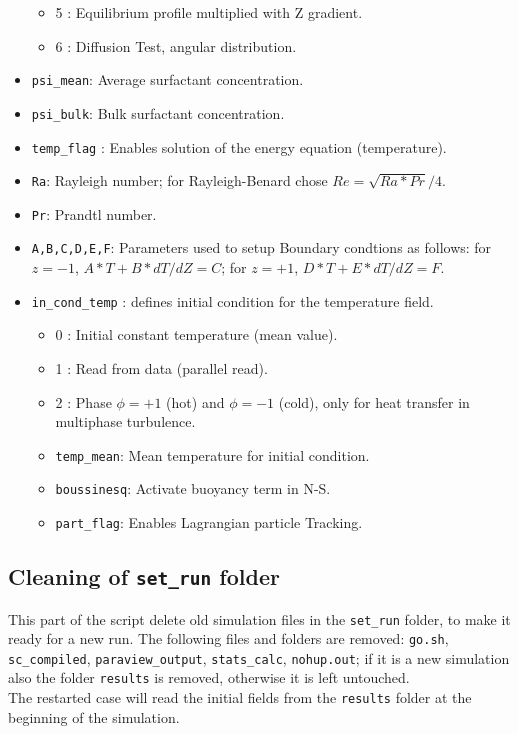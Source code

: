 \begin{itemize}
\begin{itemize}[label={$\circ$}]
\item 5 : Equilibrium profile multiplied with Z gradient.
\item 6 : Diffusion Test, angular distribution.
\end{itemize}
\item \texttt{psi\_mean}: Average surfactant concentration.
\item \texttt{psi\_bulk}: Bulk surfactant concentration.
\item \texttt{temp\_flag} : Enables solution of the energy equation (temperature).
\item \texttt{Ra}: Rayleigh number; for Rayleigh-Benard chose $Re=\sqrt{Ra*Pr}/4$.
\item \texttt{Pr}: Prandtl number.
\item \texttt{A,B,C,D,E,F}: Parameters used to setup Boundary condtions as follows: for $z=-1$, $A*T + B*dT/dZ=C$; for $z=+1$, $D*T + E*dT/dZ=F$. 
\item \texttt{in\_cond\_temp} : defines initial condition for the temperature field.
\begin{itemize}[label={$\circ$}]
\item 0 : Initial constant temperature (mean value).
\item 1 : Read from data (parallel read).
\item 2 : Phase $\phi=+1$ (hot) and $\phi=-1$ (cold), only for heat transfer in multiphase turbulence.
\item \texttt{temp\_mean}: Mean temperature for initial condition.
\item \texttt{boussinesq}: Activate buoyancy term in N-S.
\item \texttt{part\_flag}: Enables Lagrangian particle Tracking.
\end{itemize}
\end{itemize}

\subsection{Cleaning of \texttt{set\_run} folder}
\label{sec: restart}
This part of the script delete old simulation files in the \texttt{set\_run} folder, to make it ready for a new run. The following files and folders are removed: \texttt{go.sh}, \texttt{sc\_compiled}, \texttt{paraview\_output}, \texttt{stats\_calc}, \texttt{nohup.out}; if it is a new simulation also the folder \texttt{results} is removed, otherwise it is left untouched.\\
The restarted case will read the initial fields from the \texttt{results} folder at the beginning of the simulation.

